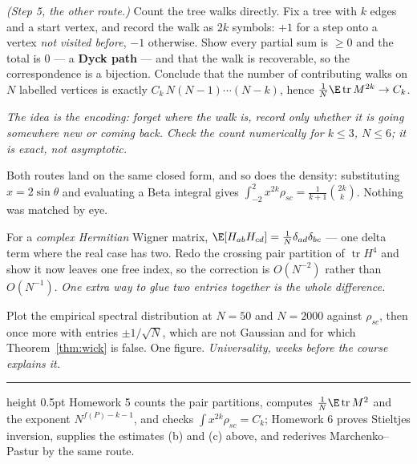 \documentclass[11pt]{article}
\providecommand{\Tr}{\operatorname{tr}}
\begin{document}
\begin{exercise}[\ty{C}]
\emph{(Step 5, the other route.)} Count the tree walks directly. Fix a tree with $k$ edges and a start vertex, and record the walk as $2k$ symbols: $+1$ for a step onto a vertex \emph{not visited before}, $-1$ otherwise. Show every partial sum is $\ge0$ and the total is $0$ --- a \textbf{Dyck path} --- and that the walk is recoverable, so the correspondence is a bijection. Conclude that the number of contributing walks on $N$ labelled vertices is exactly $C_k\,N(N-1)\cdots(N-k)$, hence $\frac1N\E\Tr M^{2k}\to C_k$.

\emph{The idea is the encoding: forget where the walk is, record only whether it is going somewhere new or coming back. Check the count numerically for $k\le3$, $N\le6$; it is exact, not asymptotic.}
\end{exercise}

Both routes land on the same closed form, and so does the density: substituting $x=2\sin\theta$ and evaluating a Beta integral gives $\int_{-2}^2x^{2k}\rho_{sc}=\frac1{k+1}\binom{2k}{k}$. Nothing was matched by eye.

\begin{exercise}[\ty{C}]
For a \emph{complex Hermitian} Wigner matrix, $\E[H_{ab}H_{cd}]=\frac1N\delta_{ad}\delta_{bc}$ --- one delta term where the real case has two. Redo the crossing pair partition of $\Tr H^4$ and show it now leaves one free index, so the correction is $O(N^{-2})$ rather than $O(N^{-1})$. \emph{One extra way to glue two entries together is the whole difference.}
\end{exercise}

\begin{exercise}[\ty{A}]
Plot the empirical spectral distribution at $N=50$ and $N=2000$ against $\rho_{sc}$, then once more with entries $\pm1/\sqrt N$, which are not Gaussian and for which Theorem~\ref{thm:wick} is false. One figure. \emph{Universality, weeks before the course explains it.}
\end{exercise}

\vspace{1em}
\hrule height 0.5pt
\vspace{0.4em}
{\footnotesize\color{grey} Homework 5 counts the pair partitions, computes $\frac1N\E\Tr M^2$ and the exponent $N^{f(P)-k-1}$, and checks $\int x^{2k}\rho_{sc}=C_k$; Homework 6 proves Stieltjes inversion, supplies the estimates (b) and (c) above, and rederives Marchenko--Pastur by the same route.}
\end{document}
